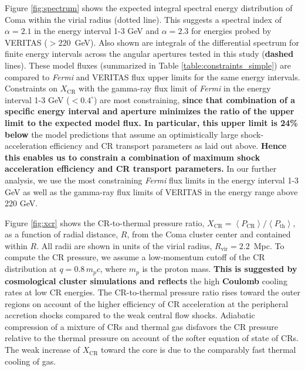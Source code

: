 \documentclass[12pt,manuscript]{aastex}
\def\Fermi{{\em Fermi}\xspace}
\newcommand{\expval}[1]{\left\langle #1 \right\rangle}
\newcommand{\rmn}{\mathrm}
\newcommand{\CR}{\mathrm{CR}}
\begin{document}
Figure \ref{fig:spectrum} shows the expected integral spectral energy distribution of Coma within
the virial radius (dotted line). This suggests a spectral index of $\alpha=2.1$ in the energy
interval 1-3 GeV and $\alpha=2.3$ for energies probed by VERITAS ($>220$~GeV). Also shown are
integrals of the differential spectrum for finite energy intervals across the angular apertures
tested in this study ({\bf dashed} lines). These model fluxes (summarized in Table
\ref{table:constraints_simple}) are compared to \Fermi and VERITAS flux upper limits for the same
energy intervals. Constraints on $X_\CR$ with the gamma-ray flux limit of \Fermi in the energy
interval 1-3 GeV ($<0.4^\circ$) are most constraining, {\bf since that combination of a specific
  energy interval and aperture minimizes the ratio of the upper limit to the expected model flux. In
  particular, this upper limit is 24\% below} the model predictions that assume an optimistically
large shock-acceleration efficiency and CR transport parameters as laid out above. {\bf Hence this
  enables us to constrain a combination of maximum shock acceleration efficiency and CR transport
  parameters.}  In our further analysis, we use the most constraining \Fermi flux limits in the
energy interval 1-3 GeV as well as the gamma-ray flux limits of VERITAS in the energy range above
220 GeV.

Figure \ref{fig:xcr} shows the CR-to-thermal pressure ratio, $X_{\CR} =
\expval{P_{\CR}}/\expval{P_\rmn{th}}$, as a function of radial distance, $R$, from the Coma cluster
center and contained within $R$. All radii are shown in units of the virial radius,
$R_\rmn{vir}=2.2$~Mpc. To compute the CR pressure, we assume a low-momentum cutoff of the CR
distribution at $q = 0.8\,m_{p}c$, where $m_{p}$ is the proton mass. {\bf This is suggested by
  cosmological cluster simulations and reflects} the high {\bf Coulomb} cooling rates at low CR
energies. The CR-to-thermal pressure ratio rises toward the outer regions on account of the higher
efficiency of CR acceleration at the peripheral accretion shocks compared to the weak central flow
shocks. Adiabatic compression of a mixture of CRs and thermal gas disfavors the CR pressure relative
to the thermal pressure on account of the softer equation of state of CRs. The weak increase of
$X_{\CR}$ toward the core is due to the comparably fast thermal cooling of gas.
\end{document}
